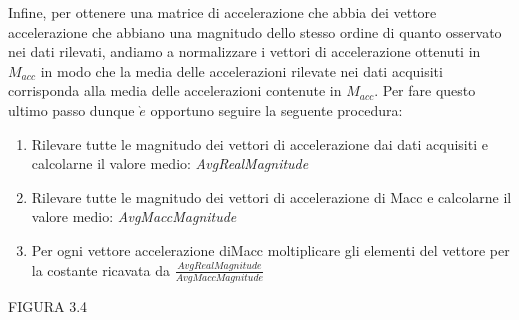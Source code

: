 Infine, per ottenere una matrice di accelerazione che abbia dei vettore accelerazione
che abbiano una magnitudo dello stesso ordine di quanto osservato nei
dati rilevati, andiamo a normalizzare i vettori di accelerazione ottenuti in $M_{acc}$
in modo che la media delle accelerazioni rilevate nei dati acquisiti corrisponda
alla media delle accelerazioni contenute in $M_{acc}$. Per fare questo ultimo passo
dunque $\grave{e}$ opportuno seguire la seguente procedura:
\begin{enumerate}
\item Rilevare tutte le magnitudo dei vettori di accelerazione dai dati acquisiti
e calcolarne il valore medio: \textit{AvgRealMagnitude}
\item Rilevare tutte le magnitudo dei vettori di accelerazione di Macc e calcolarne
il valore medio: \textit{AvgMaccMagnitude}
\item Per ogni vettore accelerazione diMacc moltiplicare gli elementi del vettore
per la costante ricavata da $\frac{AvgRealMagnitude}{AvgMaccMagnitude}$
\end{enumerate}
FIGURA 3.4


